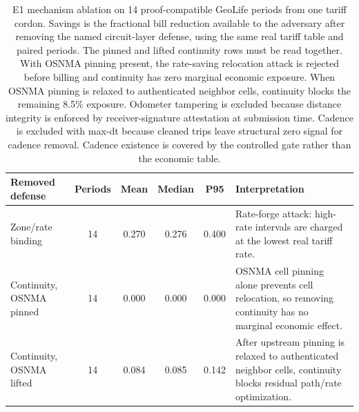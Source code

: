 \begin{table}[t]
\centering
\caption{E1 mechanism ablation on 14 proof-compatible GeoLife periods from one tariff cordon. Savings is the fractional bill reduction available to the adversary after removing the named circuit-layer defense, using the same real tariff table and paired periods. The pinned and lifted continuity rows must be read together. With OSNMA pinning present, the rate-saving relocation attack is rejected before billing and continuity has zero marginal economic exposure. When OSNMA pinning is relaxed to authenticated neighbor cells, continuity blocks the remaining 8.5\% exposure. Odometer tampering is excluded because distance integrity is enforced by receiver-signature attestation at submission time. Cadence is excluded with max-dt because cleaned trips leave structural zero signal for cadence removal. Cadence existence is covered by the controlled gate rather than the economic table.}
\label{tab:e1-mechanism-ablation}
\scriptsize
\setlength{\tabcolsep}{4pt}
\begin{tabular}{lccccp{}}
\toprule
Removed defense & Periods & Mean & Median & P95 & Interpretation \\
\midrule
Zone/rate binding & 14 & 0.270 & 0.276 & 0.400 & Rate-forge attack: high-rate intervals are charged at the lowest real tariff rate. \\
Continuity, OSNMA pinned & 14 & 0.000 & 0.000 & 0.000 & OSNMA cell pinning alone prevents cell relocation, so removing continuity has no marginal economic effect. \\
Continuity, OSNMA lifted & 14 & 0.084 & 0.085 & 0.142 & After upstream pinning is relaxed to authenticated neighbor cells, continuity blocks residual path/rate optimization. \\
\bottomrule
\end{tabular}
\end{table}
